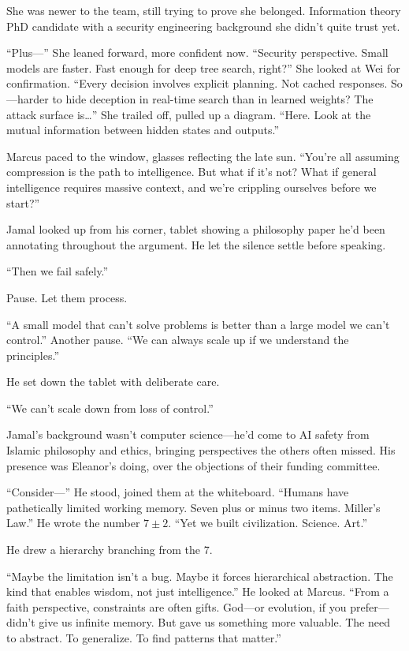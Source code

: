 She was newer to the team, still trying to prove she belonged. Information theory PhD candidate with a security engineering background she didn't quite trust yet.

``Plus---'' She leaned forward, more confident now. ``Security perspective. Small models are faster. Fast enough for deep tree search, right?'' She looked at Wei for confirmation. ``Every decision involves explicit planning. Not cached responses. So---harder to hide deception in real-time search than in learned weights? The attack surface is\ldots{}'' She trailed off, pulled up a diagram. ``Here. Look at the mutual information between hidden states and outputs.''

Marcus paced to the window, glasses reflecting the late sun. ``You're all assuming compression is the path to intelligence. But what if it's not? What if general intelligence requires massive context, and we're crippling ourselves before we start?''

Jamal looked up from his corner, tablet showing a philosophy paper he'd been annotating throughout the argument. He let the silence settle before speaking.

``Then we fail safely.''

Pause. Let them process.

``A small model that can't solve problems is better than a large model we can't control.'' Another pause. ``We can always scale up if we understand the principles.''

He set down the tablet with deliberate care.

``We can't scale down from loss of control.''

Jamal's background wasn't computer science---he'd come to AI safety from Islamic philosophy and ethics, bringing perspectives the others often missed. His presence was Eleanor's doing, over the objections of their funding committee.

``Consider---'' He stood, joined them at the whiteboard. ``Humans have pathetically limited working memory. Seven plus or minus two items. Miller's Law.'' He wrote the number $7 \pm 2$. ``Yet we built civilization. Science. Art.''

He drew a hierarchy branching from the 7.

``Maybe the limitation isn't a bug. Maybe it forces hierarchical abstraction. The kind that enables wisdom, not just intelligence.'' He looked at Marcus. ``From a faith perspective, constraints are often gifts. God---or evolution, if you prefer---didn't give us infinite memory. But gave us something more valuable. The need to abstract. To generalize. To find patterns that matter.''

